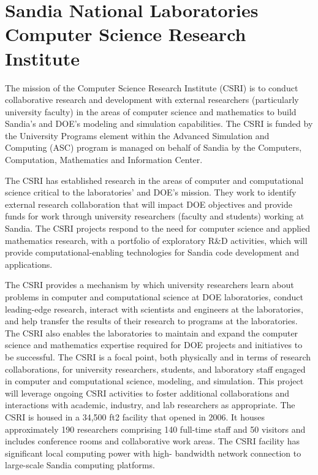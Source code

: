 
\section*{Sandia National Laboratories Computer Science Research Institute}

The mission of
the Computer Science Research Institute (CSRI) is to conduct collaborative
research and development with external researchers (particularly university
faculty) in the areas of computer science and mathematics to build Sandia’s and
DOE’s modeling and simulation capabilities. The CSRI is funded by the
University Programs element within the Advanced Simulation and Computing (ASC)
program is managed on behalf of Sandia by the Computers, Computation,
Mathematics and Information Center. 

The CSRI has established research in the areas of computer and computational
science critical to the laboratories’ and DOE’s mission. They work to identify
external research collaboration that will impact DOE objectives and provide
funds for work through university researchers (faculty and students) working at
Sandia.  The CSRI projects respond to the need for computer science and applied
mathematics research, with a portfolio of exploratory R\&D activities, which
will provide computational-enabling technologies for Sandia code development
and applications. 

The CSRI provides a mechanism by which university researchers
learn about problems in computer and computational science at DOE laboratories,
conduct leading-edge research, interact with scientists and engineers at the
laboratories, and help transfer the results of their research to programs at
the laboratories. The CSRI also enables the laboratories to maintain and expand
the computer science and mathematics expertise required for DOE projects and
initiatives to be successful. The CSRI is a focal point, both physically and in
terms of research collaborations, for university researchers, students, and
laboratory staff engaged in computer and computational science, modeling, and
simulation. This project will leverage ongoing CSRI activities to foster
additional collaborations and interactions with academic, industry, and lab
researchers as appropriate.  The CSRI is housed in a 34,500 ft2 facility that
opened in 2006.  It houses approximately 190 researchers comprising 140
full-time staff and 50 visitors and includes conference rooms and collaborative
work areas. The CSRI facility has significant local computing power with high-
bandwidth network connection to large-scale Sandia computing platforms.

